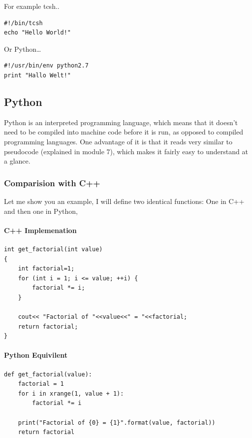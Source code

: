 For example tcsh..

\begin{verbatim}
#!/bin/tcsh
echo "Hello World!"
\end{verbatim}

Or Python\ldots{}

\begin{verbatim}
#!/usr/bin/env python2.7
print "Hallo Welt!"
\end{verbatim}

\hypertarget{python}{%
\subsection{Python}\label{python}}

Python is an interpreted programming language, which means that it doesn't need to be compiled into machine code before it is run, as opposed to compiled programming languages. One advantage of it is that it reads very similar to pseudocode (explained in module 7), which makes it fairly easy to understand at a glance.

\hypertarget{comparision-with-c}{%
\subsubsection{Comparision with C++}\label{comparision-with-c}}

Let me show you an example, I will define two identical functions: One in C++ and then one in Python,

\hypertarget{c-implemenation}{%
\paragraph{C++ Implemenation}\label{c-implemenation}}

\begin{verbatim}
int get_factorial(int value)
{
    int factorial=1;
    for (int i = 1; i <= value; ++i) {
        factorial *= i;
    }

    cout<< "Factorial of "<<value<<" = "<<factorial;
    return factorial;
}
\end{verbatim}

\hypertarget{python-equivilent}{%
\paragraph{Python Equivilent}\label{python-equivilent}}

\begin{verbatim}
def get_factorial(value):
    factorial = 1
    for i in xrange(1, value + 1):
        factorial *= i

    print("Factorial of {0} = {1}".format(value, factorial))
    return factorial
\end{verbatim}

